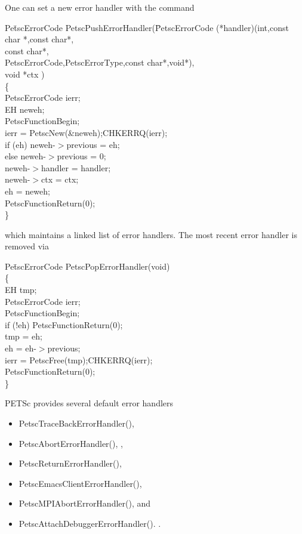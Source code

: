 \documentclass[twoside,12pt]{../sty/report_petsc}
\begin{document}
One can set a new error handler with the command
\begin{tabbing}
Pe\=tscErrorCode PetscPushErrorHandler(\=PetscErrorCode (*handler)(int,const char *,const char*,\\
   \> \>                       const char*,\\
    \> \>                      PetscErrorCode,PetscErrorType,const char*,void*),\\
   \>  \>                      void *ctx )\\
\{\\
  \> PetscErrorCode ierr;\\
  \>EH neweh; \\
  \>PetscFunctionBegin;\\
  \>ierr = PetscNew(\&neweh);CHKERRQ(ierr);\\
  \>if (eh) {neweh-$>$previous = eh;} \\
  \>else    {neweh-$>$previous = 0;}\\
  \>neweh-$>$handler = handler;\\
  \>neweh-$>$ctx     = ctx;\\
  \>eh             = neweh;\\
  \>PetscFunctionReturn(0);\\
\}
\end{tabbing}
which maintains a linked list of error handlers. The most recent error handler is removed
via
\begin{tabbing}
Pe\=tscErrorCode PetscPopErrorHandler(void)\\
\{\\
 \> EH tmp;\\
\>  PetscErrorCode ierr;\\
\>  PetscFunctionBegin;\\
\>  if (!eh) PetscFunctionReturn(0);\\
\>  tmp = eh;\\
\>  eh  = eh-$>$previous;\\
\>  ierr = PetscFree(tmp);CHKERRQ(ierr);\\
\>  PetscFunctionReturn(0);\\
\}
\end{tabbing}

PETSc provides several default error handlers
\begin{itemize}
\item PetscTraceBackErrorHandler(), 
\item PetscAbortErrorHandler(), ,
\item PetscReturnErrorHandler(),
\item PetscEmacsClientErrorHandler(), 
\item PetscMPIAbortErrorHandler(), and
\item PetscAttachDebuggerErrorHandler(). .
\end{itemize}
\end{document}
